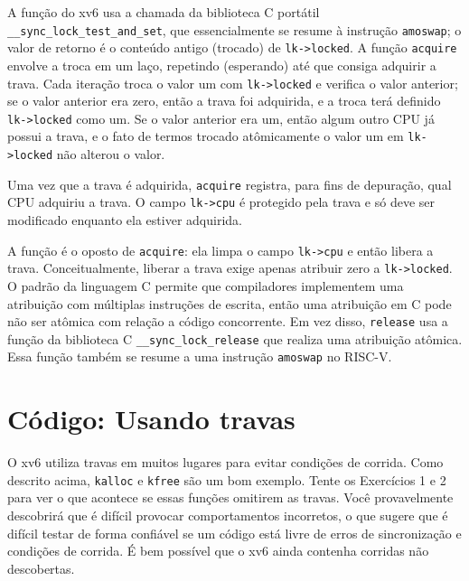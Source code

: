 A função
do xv6
usa a chamada da biblioteca C portátil
\lstinline{__sync_lock_test_and_set},
que essencialmente se resume à instrução
\lstinline{amoswap};
o valor de retorno é o conteúdo antigo (trocado) de
\lstinline{lk->locked}.
A função
\lstinline{acquire}
envolve a troca em um laço, repetindo (esperando) até que consiga
adquirir a trava.
Cada iteração troca o valor um com
\lstinline{lk->locked}
e verifica o valor anterior;
se o valor anterior era zero, então a trava foi adquirida,
e a troca terá definido
\lstinline{lk->locked}
como um.
Se o valor anterior era um, então algum outro CPU
já possui a trava, e o fato de termos trocado atômicamente o valor um
em
\lstinline{lk->locked}
não alterou o valor.

Uma vez que a trava é adquirida,
\lstinline{acquire}
registra, para fins de depuração, qual CPU
adquiriu a trava.
O campo
\lstinline{lk->cpu}
é protegido pela trava
e só deve ser modificado enquanto ela estiver adquirida.

A função
é o oposto de 
\lstinline{acquire}:
ela limpa o campo
\lstinline{lk->cpu}
e então libera a trava.
Conceitualmente, liberar a trava exige apenas atribuir zero a
\lstinline{lk->locked}.
O padrão da linguagem C permite que compiladores implementem uma atribuição
com múltiplas instruções de escrita,
então uma atribuição em C pode não ser atômica com relação a código concorrente.
Em vez disso,
\lstinline{release}
usa a função da biblioteca C
\lstinline{__sync_lock_release}
que realiza uma atribuição atômica.
Essa função também se resume a uma instrução
\lstinline{amoswap}
no RISC-V.

\section{Código: Usando travas}

O xv6 utiliza travas em muitos lugares para evitar condições de corrida.
Como descrito acima,
\lstinline{kalloc}
e
\lstinline{kfree}
são um bom exemplo.
Tente os Exercícios 1 e 2 para ver o que acontece se essas
funções omitirem as travas.
Você provavelmente descobrirá que é difícil provocar comportamentos incorretos,
o que sugere que é difícil testar de forma confiável se um código
está livre de erros de sincronização e condições de corrida.
É bem possível que o xv6 ainda contenha corridas não descobertas.

